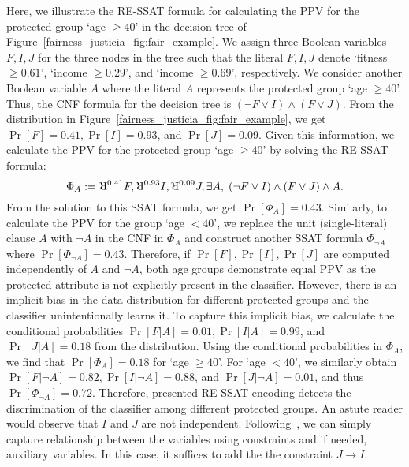 \begin{example}
	\label{fairness_justicia_example:re_ssat}
	Here, we illustrate the RE-SSAT formula for calculating the PPV for the protected group `age $ \ge 40 $' in the decision tree of Figure~\ref{fairness_justicia_fig:fair_example}. We assign three Boolean variables $ F,I,J $ for the three nodes in the tree such that the literal $ F,I,J $ denote `fitness $ \ge 0.61 $', `income $ \ge 0.29 $', and `income $ \ge 0.69 $', respectively. We consider another Boolean variable $A$  where the literal $ A $ represents the protected group `age $ \ge 40 $'. Thus, the CNF formula  for the decision tree is $ (\neg F \vee I) \wedge (F \vee J) $. From the distribution in Figure~\ref{fairness_justicia_fig:fair_example}, we get $ \Pr[F] = 0.41, \Pr[I] = 0.93 $, and $ \Pr[J] = 0.09 $. Given this information, we calculate the PPV for the protected group `age $ \ge 40 $' by solving the RE-SSAT formula:
	\begin{equation}
	\Phi_A := \R^{0.41}F, \R^{0.93}I, \R^{0.09}J, \exists A, \; (\neg F \vee I) \wedge (F \vee J) \wedge A.\notag
	\end{equation}
	From the solution to this SSAT formula, we get $ \Pr[\Phi_A] = 0.43 $. Similarly, to calculate the PPV for the group `age $ < 40 $', we replace the unit (single-literal) clause $ A $ with $ \neg A $ in the CNF in $ \Phi_A $ and construct another SSAT formula $ \Phi_{\neg A} $ where $ \Pr[\Phi_{\neg A}] = 0.43 $. 
	Therefore, if $\Pr[F], \Pr[I], \Pr[J]$ are computed independently of $A$ and $\neg A$, both age groups demonstrate equal PPV as the protected attribute is not explicitly present in the classifier. 
	However, there is an implicit bias in the data distribution for different protected groups and the classifier unintentionally learns it. 
	To capture this implicit bias, we calculate the conditional probabilities  $ \Pr[F|A] = 0.01, \Pr[I|A] = 0.99 $, and $ \Pr[J|A] = 0.18 $ from the distribution. Using the conditional probabilities in  $\Phi_A $, we find that $ \Pr[\Phi_A] = 0.18 $ for `age $ \ge 40 $'. For `age $ < 40 $',  we similarly obtain $ \Pr[F|\neg A] = 0.82, \Pr[I|\neg A] = 0.88 $, and $ \Pr[J|\neg A] = 0.01 $, and thus  $ \Pr[\Phi_{\neg A}] = 0.72 $. 
	Therefore, presented RE-SSAT encoding detects the discrimination of the classifier among different protected groups. An astute reader would observe that $I$ and $J$ are not independent. Following~\cite{chavira2008probabilistic}, we can simply capture relationship between the variables using constraints and if needed, auxiliary variables. In this case, it suffices to add the the constraint $J \rightarrow I$. 
\end{example}

